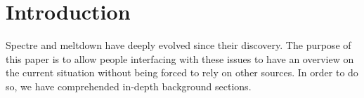 \section{Introduction}
Spectre and meltdown have deeply evolved since their discovery.
The purpose of this paper is to allow people interfacing with these issues to have an overview on the current situation without being forced to rely on other sources.
In order to do so, we have comprehended in-depth background sections.

